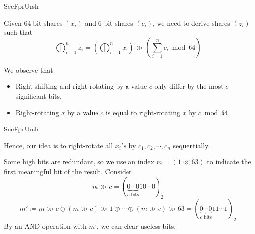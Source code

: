 \begin{frame}{SecFprUrsh}

%
%
%
\iffalse
Given 64-bit shares $(x_i)$ and 6-bit shares $(c_i)$, we need to derive shares $(z_i)$ such that
\[
\bigoplus_{i=1}^n z_i = \left( \left( \bigoplus_{i=1}^n x_i \right) \gg \left( \sum_{i=1}^n c_i \bmod 2^{6} \right) \right) \vee \left \llbracket \bigoplus_{i=1}^n x_i^{[c:1]} \neq 0 \right \rrbracket
\]
%
%
%
\fi

Given 64-bit shares $(x_i)$ and 6-bit shares $(c_i)$, we need to derive shares $(z_i)$ such that
\[
\bigoplus_{i=1}^n z_i = \left( \bigoplus_{i=1}^n x_i \right) \gg \left( \sum_{i=1}^n c_i \bmod 64 \right)
\]

\pause
\medskip

We observe that
\pause
\begin{itemize}

\item Right-shifting and right-rotating by a value $c$ only differ by the most $c$ significant bits.
\pause
\item Right-rotating $x$ by a value $c$ is equal to right-rotating $x$ by $c \bmod 64$.
\end{itemize}

\end{frame}


\begin{frame}{SecFprUrsh}

Hence, our idea is to right-rotate all $x_i's$ by $c_1, c_2, \cdots, c_n$ sequentially.
\pause
\medskip

Some high bits are redundant, so we use an index $m = (1 \ll 63)$ to indicate the first meaningful bit of the result.
\pause
Consider
\[
m \gg c = (\underbrace{0 \cdots 0}_{c \text{ bits}} 1 0 \cdots 0)_2
\]
\pause
\[
m' := m \gg c \oplus (m \gg c) \gg 1 \oplus \cdots \oplus (m \gg c) \gg 63 = (\underbrace{0 \cdots 0}_{c \text{ bits}} 1 1 \cdots 1)_2
\]
\pause
By an AND operation with $m'$, we can clear useless bits.

\end{frame}


%
%
%
\iffalse

